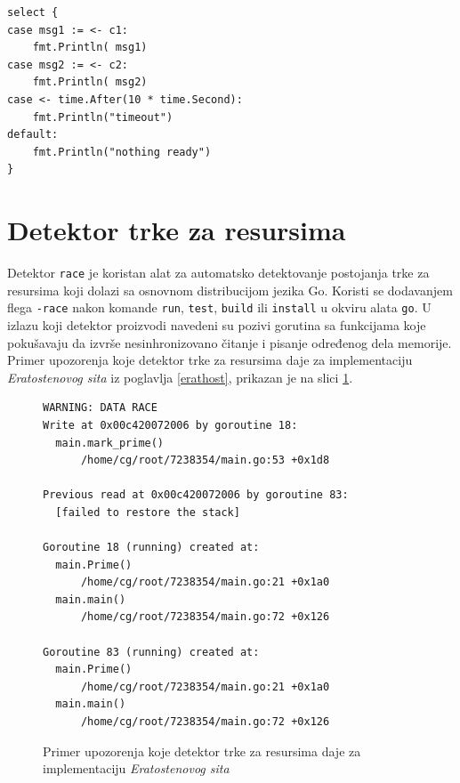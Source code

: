 \documentclass[12pt,oneside]{memoir}
\begin{document}
\begin{center}
\begin{lstlisting}[caption=Primer upotrebe naredbe \texttt{select}, label={lst:select},  backgroundcolor=\color{background}]
select {
case msg1 := <- c1:
	fmt.Println( msg1)
case msg2 := <- c2:
	fmt.Println( msg2)
case <- time.After(10 * time.Second):
	fmt.Println("timeout")
default:
	fmt.Println("nothing ready")
}					
\end{lstlisting}
\end{center}

\section{Detektor trke za resursima} \label{datarace}

Detektor \texttt{race} je koristan alat za automatsko detektovanje postojanja trke za resursima koji dolazi sa osnovnom distribucijom jezika Go. Koristi se dodavanjem flega \texttt{-race} nakon komande \texttt{run}, \texttt{test}, \texttt{build} ili \texttt{install} u okviru alata \texttt{go}. U izlazu koji detektor proizvodi navedeni su pozivi gorutina sa funkcijama koje pokušavaju da izvrše nesinhronizovano čitanje i pisanje određenog dela memorije. Primer upozorenja koje detektor trke za resursima daje za implementaciju \textit{Eratostenovog sita} iz poglavlja \ref{erathost}, prikazan je na slici \ref{fig:datarace}.

\begin{figure}
\begin{center}

\begin{Verbatim}[fontsize=\small]
WARNING: DATA RACE
Write at 0x00c420072006 by goroutine 18:
  main.mark_prime()
      /home/cg/root/7238354/main.go:53 +0x1d8

Previous read at 0x00c420072006 by goroutine 83:
  [failed to restore the stack]

Goroutine 18 (running) created at:
  main.Prime()
      /home/cg/root/7238354/main.go:21 +0x1a0
  main.main()
      /home/cg/root/7238354/main.go:72 +0x126

Goroutine 83 (running) created at:
  main.Prime()
      /home/cg/root/7238354/main.go:21 +0x1a0
  main.main()
      /home/cg/root/7238354/main.go:72 +0x126
\end{Verbatim}

\caption{Primer upozorenja koje detektor trke za resursima daje za implementaciju \textit{Eratostenovog sita}}
\label{fig:datarace}
\end{center}
\end{figure}
\end{document}
